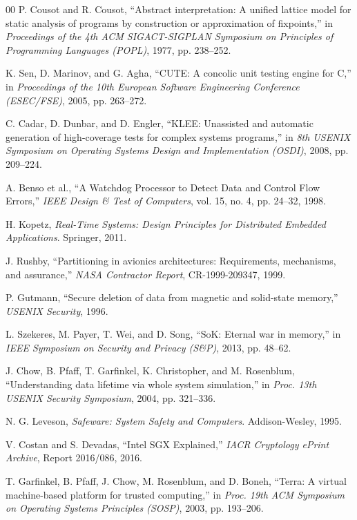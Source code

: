 \documentclass[conference]{IEEEtran}
\begin{document}
\begin{thebibliography}{00}
 P. Cousot and R. Cousot, ``Abstract interpretation: A unified lattice model for static analysis of programs by construction or approximation of fixpoints,'' in \textit{Proceedings of the 4th ACM SIGACT-SIGPLAN Symposium on Principles of Programming Languages (POPL)}, 1977, pp. 238--252.

 K. Sen, D. Marinov, and G. Agha, ``CUTE: A concolic unit testing engine for C,'' in \textit{Proceedings of the 10th European Software Engineering Conference (ESEC/FSE)}, 2005, pp. 263--272.

 C. Cadar, D. Dunbar, and D. Engler, ``KLEE: Unassisted and automatic generation of high-coverage tests for complex systems programs,'' in \textit{8th USENIX Symposium on Operating Systems Design and Implementation (OSDI)}, 2008, pp. 209--224.

 A. Benso et al., ``A Watchdog Processor to Detect Data and Control Flow Errors,'' \textit{IEEE Design \& Test of Computers}, vol. 15, no. 4, pp. 24--32, 1998.


 H. Kopetz, \textit{Real-Time Systems: Design Principles for Distributed Embedded Applications}. Springer, 2011.

 J. Rushby, ``Partitioning in avionics architectures: Requirements, mechanisms, and assurance,'' \textit{NASA Contractor Report}, CR-1999-209347, 1999.

 P. Gutmann, ``Secure deletion of data from magnetic and solid-state memory,'' \textit{USENIX Security}, 1996.


 L. Szekeres, M. Payer, T. Wei, and D. Song, ``SoK: Eternal war in memory,'' in \textit{IEEE Symposium on Security and Privacy (S\&P)}, 2013, pp. 48--62.

 J. Chow, B. Pfaff, T. Garfinkel, K. Christopher, and M. Rosenblum, ``Understanding data lifetime via whole system simulation,'' in \textit{Proc. 13th USENIX Security Symposium}, 2004, pp. 321--336.

 N. G. Leveson, \textit{Safeware: System Safety and Computers}. Addison-Wesley, 1995.


 V. Costan and S. Devadas, ``Intel SGX Explained,'' \textit{IACR Cryptology ePrint Archive}, Report 2016/086, 2016.

 T. Garfinkel, B. Pfaff, J. Chow, M. Rosenblum, and D. Boneh, ``Terra: A virtual machine-based platform for trusted computing,'' in \textit{Proc. 19th ACM Symposium on Operating Systems Principles (SOSP)}, 2003, pp. 193--206.


\end{thebibliography}
\end{document}

